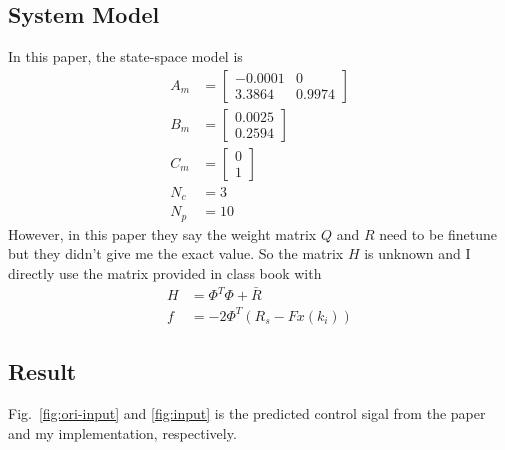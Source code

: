 \documentclass{article}
\begin{document}
\subsection{System Model}
In this paper, the state-space model is
\begin{align}
    A_m &= \begin{bmatrix} -0.0001 & 0 \\ 3.3864 & 0.9974 \end{bmatrix} \\
    B_m &= \begin{bmatrix} 0.0025 \\ 0.2594  \end{bmatrix} \\
    C_m &= \begin{bmatrix} 0 \\ 1  \end{bmatrix} \\
    N_c &= 3 \\
    N_p &= 10
\end{align}
However, in this paper they say the weight matrix $Q$ and $R$ need to be finetune but they didn't give me the exact value. So the matrix $H$ is unknown 
and I directly use the matrix provided in class book with
\begin{align}
    H &= \Phi^T\Phi + \bar{R} \\
    f &= -2\Phi^T(R_s - Fx(k_i))
\end{align}

\subsection{Result}
Fig.~\ref{fig:ori-input} and \ref{fig:input} is the predicted control sigal from the paper and my implementation, respectively.
\end{document}
